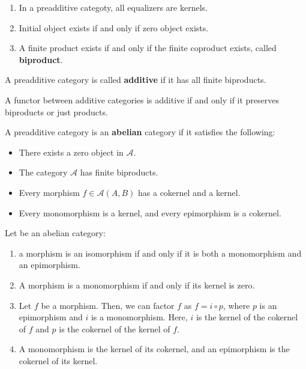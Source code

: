 \begin{example}
\begin{prop}
    \begin{enumerate}
        \item In a preadditive categoty, all equalizers are kernels.
        \item Initial object exists if and only if zero object exists.
        \item A finite product exists if and only if the finite coproduct exists, called \textbf{biproduct}.
    \end{enumerate}
\end{prop}

A preadditive category is called \textbf{additive} if it has all finite biproducts.\\

\begin{prop}
A functor between additive categories is additive if and only if it preserves biproducts or just products.
\end{prop}

A preadditive category is an \textbf{abelian} category if it satisfies the following: 
\begin{itemize}
    \item There exists a zero object in $\mathcal{A}$.
    \item The category $\mathcal{A}$ has finite biproducts.
    \item Every morphism $f \in \mathcal{A}(A, B)$ has a cokernel and a kernel.
    \item Every monomorphism is a kernel, and every epimorphism is a cokernel.
\end{itemize}

\begin{theo} Let \ca be an abelian category:
\begin{enumerate}
    \item a morphism is an isomorphism if and only if it is both a monomorphism and an epimorphism.
    \item A morphism is a monomorphism if and only if its kernel is zero.
    \item Let $f$ be a morphism. Then, we can factor $f$ as $f=i \circ p$, where $p$ is an epimorphism and $i$ is a monomorphism. Here, $i$ is the kernel of the cokernel of $f$ and $p$ is the cokernel of the kernel of $f$.
    \item A monomorphism is the kernel of its cokernel, and an epimorphism is the cokernel of its kernel.
\end{enumerate}   
\end{theo}


\end{example}
